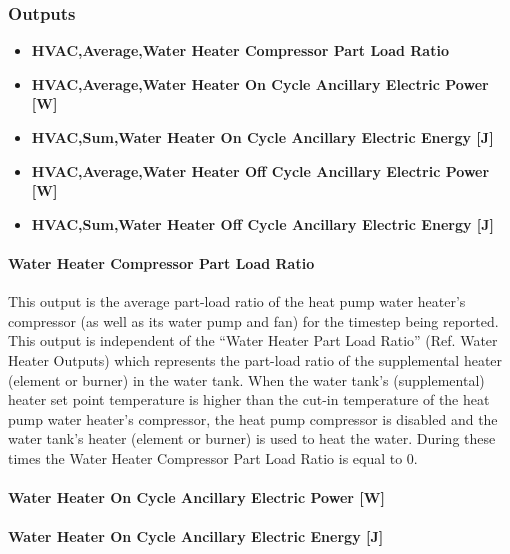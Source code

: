 \subsubsection{Outputs}\label{outputs-2-025}

\begin{itemize}
\item
  \textbf{HVAC,Average,Water Heater Compressor Part Load Ratio}
\item
  \textbf{HVAC,Average,Water Heater On Cycle Ancillary Electric Power {[}W{]}}
\item
  \textbf{HVAC,Sum,Water Heater On Cycle Ancillary Electric Energy {[}J{]}}
\item
  \textbf{HVAC,Average,Water Heater Off Cycle Ancillary Electric Power {[}W{]}}
\item
  \textbf{HVAC,Sum,Water Heater Off Cycle Ancillary Electric Energy {[}J{]}}
\end{itemize}

\paragraph{Water Heater Compressor Part Load Ratio}\label{water-heater-compressor-part-load-ratio}

This output is the average part-load ratio of the heat pump water heater's compressor (as well as its water pump and fan) for the timestep being reported. This output is independent of the ``Water Heater Part Load Ratio'' (Ref. Water Heater Outputs) which represents the part-load ratio of the supplemental heater (element or burner) in the water tank. When the water tank's (supplemental) heater set point temperature is higher than the cut-in temperature of the heat pump water heater's compressor, the heat pump compressor is disabled and the water tank's heater (element or burner) is used to heat the water. During these times the Water Heater Compressor Part Load Ratio is equal to 0.

\paragraph{Water Heater On Cycle Ancillary Electric Power {[}W{]}}\label{water-heater-on-cycle-ancillary-electric-power-w}

\paragraph{Water Heater On Cycle Ancillary Electric Energy {[}J{]}}\label{water-heater-on-cycle-ancillary-electric-energy-j}

